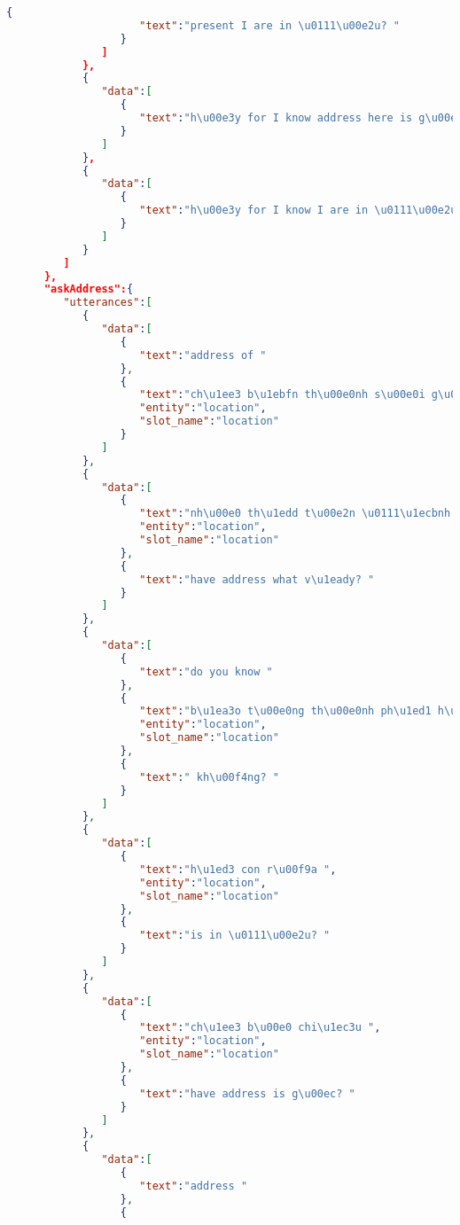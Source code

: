 \begin{lstlisting}[language=json,firstnumber=1]
                  {
                     "text":"present I are in \u0111\u00e2u? "
                  }
               ]
            },
            {
               "data":[
                  {
                     "text":"h\u00e3y for I know address here is g\u00ec? "
                  }
               ]
            },
            {
               "data":[
                  {
                     "text":"h\u00e3y for I know I are in \u0111\u00e2u? "
                  }
               ]
            }
         ]
      },
      "askAddress":{
         "utterances":[
            {
               "data":[
                  {
                     "text":"address of "
                  },
                  {
                     "text":"ch\u1ee3 b\u1ebfn th\u00e0nh s\u00e0i g\u00f2n ",
                     "entity":"location",
                     "slot_name":"location"
                  }
               ]
            },
            {
               "data":[
                  {
                     "text":"nh\u00e0 th\u1edd t\u00e2n \u0111\u1ecbnh s\u00e0i g\u00f2n ",
                     "entity":"location",
                     "slot_name":"location"
                  },
                  {
                     "text":"have address what v\u1eady? "
                  }
               ]
            },
            {
               "data":[
                  {
                     "text":"do you know "
                  },
                  {
                     "text":"b\u1ea3o t\u00e0ng th\u00e0nh ph\u1ed1 h\u1ed3 ch\u00ed minh ",
                     "entity":"location",
                     "slot_name":"location"
                  },
                  {
                     "text":" kh\u00f4ng? "
                  }
               ]
            },
            {
               "data":[
                  {
                     "text":"h\u1ed3 con r\u00f9a ",
                     "entity":"location",
                     "slot_name":"location"
                  },
                  {
                     "text":"is in \u0111\u00e2u? "
                  }
               ]
            },
            {
               "data":[
                  {
                     "text":"ch\u1ee3 b\u00e0 chi\u1ec3u ",
                     "entity":"location",
                     "slot_name":"location"
                  },
                  {
                     "text":"have address is g\u00ec? "
                  }
               ]
            },
            {
               "data":[
                  {
                     "text":"address "
                  },
                  {

\end{lstlisting}
